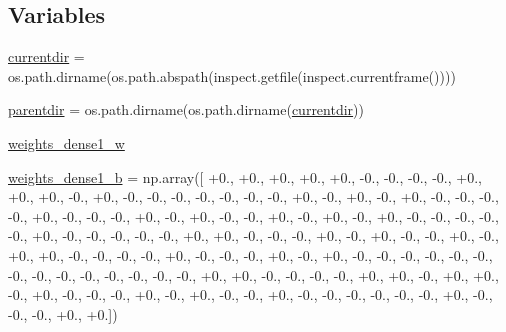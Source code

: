 \subsection*{Variables}
\begin{DoxyCompactItemize}
\item 
\hyperlink{namespacepybullet-gym_1_1pybulletgym_1_1examples_1_1roboschool-weights_1_1enjoy___t_f___walker2_d_py_bullet_env__v0__2017may_a55327a18ab2b7eac4ad98e22ae50b071}{currentdir} = os.\+path.\+dirname(os.\+path.\+abspath(inspect.\+getfile(inspect.\+currentframe())))
\item 
\hyperlink{namespacepybullet-gym_1_1pybulletgym_1_1examples_1_1roboschool-weights_1_1enjoy___t_f___walker2_d_py_bullet_env__v0__2017may_a3c9e973d222f56154c667cc330212677}{parentdir} = os.\+path.\+dirname(os.\+path.\+dirname(\hyperlink{namespacepybullet-gym_1_1pybulletgym_1_1examples_1_1roboschool-weights_1_1enjoy___t_f___walker2_d_py_bullet_env__v0__2017may_a55327a18ab2b7eac4ad98e22ae50b071}{currentdir}))
\item 
\hyperlink{namespacepybullet-gym_1_1pybulletgym_1_1examples_1_1roboschool-weights_1_1enjoy___t_f___walker2_d_py_bullet_env__v0__2017may_a56a6607c9790036edc4bf6d3863c2bcc}{weights\+\_\+dense1\+\_\+w}
\item 
\hyperlink{namespacepybullet-gym_1_1pybulletgym_1_1examples_1_1roboschool-weights_1_1enjoy___t_f___walker2_d_py_bullet_env__v0__2017may_a82cf1d4cc81578ba24ccae77f20e30be}{weights\+\_\+dense1\+\_\+b} = np.\+array(\mbox{[} +0., +0., +0., +0., +0., -\/0., -\/0., -\/0., -\/0., +0., +0., +0., -\/0., +0., -\/0., -\/0., -\/0., -\/0., -\/0., -\/0., -\/0., +0., -\/0., +0., -\/0., +0., -\/0., -\/0., -\/0., -\/0., +0., -\/0., -\/0., -\/0., +0., -\/0., +0., -\/0., -\/0., +0., -\/0., +0., -\/0., +0., -\/0., -\/0., -\/0., -\/0., -\/0., +0., -\/0., -\/0., -\/0., -\/0., -\/0., +0., +0., -\/0., -\/0., -\/0., +0., -\/0., +0., -\/0., -\/0., +0., -\/0., +0., +0., -\/0., -\/0., -\/0., -\/0., +0., -\/0., -\/0., -\/0., +0., -\/0., +0., -\/0., -\/0., -\/0., -\/0., -\/0., -\/0., -\/0., -\/0., -\/0., -\/0., -\/0., -\/0., -\/0., -\/0., +0., +0., -\/0., -\/0., -\/0., -\/0., +0., +0., -\/0., +0., +0., -\/0., +0., -\/0., -\/0., -\/0., +0., -\/0., +0., -\/0., -\/0., +0., -\/0., -\/0., -\/0., -\/0., -\/0., -\/0., +0., -\/0., -\/0., -\/0., +0., +0.\mbox{]})

\end{DoxyCompactItemize}
